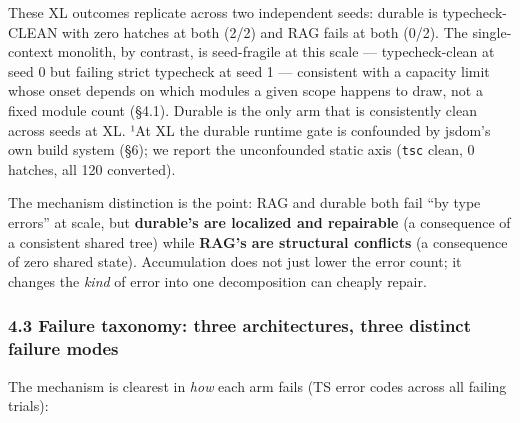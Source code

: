 \documentclass[
  10pt,
]{article}
\begin{document}
These XL outcomes replicate across two independent seeds: durable is
typecheck-CLEAN with zero hatches at both (2/2) and RAG fails at both
(0/2). The single-context monolith, by contrast, is seed-fragile at this
scale --- typecheck-clean at seed 0 but failing strict typecheck at seed
1 --- consistent with a capacity limit whose onset depends on which
modules a given scope happens to draw, not a fixed module count (§4.1).
Durable is the only arm that is consistently clean across seeds at XL.
¹At XL the durable runtime gate is confounded by jsdom's own build
system (§6); we report the unconfounded static axis (\texttt{tsc} clean,
0 hatches, all 120 converted).

The mechanism distinction is the point: RAG and durable both fail ``by
type errors'' at scale, but \textbf{durable's are localized and
repairable} (a consequence of a consistent shared tree) while
\textbf{RAG's are structural conflicts} (a consequence of zero shared
state). Accumulation does not just lower the error count; it changes the
\emph{kind} of error into one decomposition can cheaply repair.

\subsubsection{4.3 Failure taxonomy: three architectures, three distinct
failure
modes}\label{failure-taxonomy-three-architectures-three-distinct-failure-modes}

The mechanism is clearest in \emph{how} each arm fails (TS error codes
across all failing trials):
\end{document}
